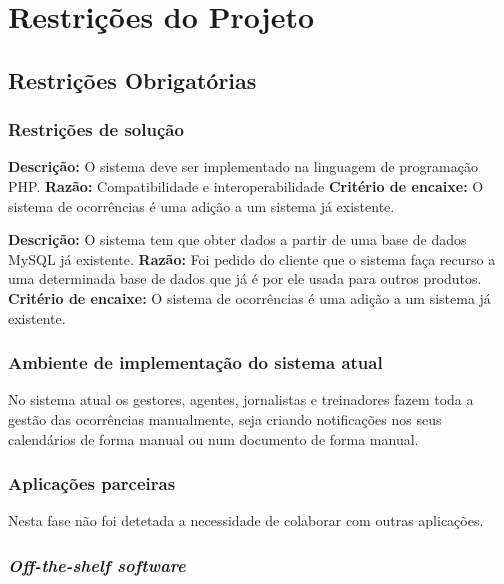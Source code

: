 \chapter{Restrições do Projeto}

\section{Restrições Obrigatórias}

\subsection{Restrições de solução}
\noindent\textbf{Descrição:} O sistema deve ser implementado na linguagem de programação PHP.
\newline\textbf{Razão:} Compatibilidade e interoperabilidade
\newline\textbf{Critério de encaixe:} O sistema de ocorrências é uma adição a um sistema já existente.

\vspace{3mm}

\noindent\textbf{Descrição:} O sistema tem que obter dados a partir de uma base de dados MySQL já existente.
\newline\textbf{Razão:} Foi pedido do cliente que o sistema faça recurso a uma determinada base de dados que já é por ele usada para outros produtos.
\newline\textbf{Critério de encaixe:} O sistema de ocorrências é uma adição a um sistema já existente.

\subsection{Ambiente de implementação do sistema atual}

No sistema atual os gestores, agentes, jornalistas e treinadores fazem toda a gestão das ocorrências manualmente, seja criando notificações nos seus calendários de forma manual ou num documento de forma manual.

\subsection{Aplicações parceiras}

Nesta fase não foi detetada a necessidade de colaborar com outras aplicações.

\subsection{\emph{Off-the-shelf software}}

